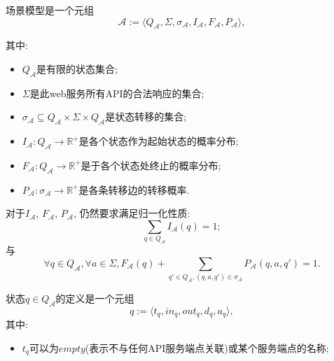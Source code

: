         \begin{definition}
            \label{def:our}
            场景模型是一个元组
            \begin{equation}
                \label{eq:scenario_model}
                 \mathcal{A} := \langle Q_{\mathcal{A}}, \Sigma, \sigma_{\mathcal{A}}, I_{\mathcal{A}}, F_{\mathcal{A}}, P_{\mathcal{A}} \rangle,
            \end{equation}
            
            其中:
            \begin{itemize}
                \item $Q_{\mathcal{A}}$是有限的状态集合;
                
                \item $\Sigma$是此web服务所有API的合法响应的集合;
                
                \item $\sigma_{\mathcal{A}} \subseteq Q_{\mathcal{A}} \times \Sigma \times Q_{\mathcal{A}}$是状态转移的集合;
                
                \item $I_{\mathcal{A}} : Q_{\mathcal{A}} \to \mathbb{R}^{+}$是各个状态作为起始状态的概率分布;
                
                \item $F_{\mathcal{A}} : Q_{\mathcal{A}} \to \mathbb{R}^{+}$是于各个状态处终止的概率分布;
                
                \item $P_{\mathcal{A}}: \sigma_{\mathcal{A}} \to \mathbb{R}^{+}$是各条转移边的转移概率.
            \end{itemize}
            
            对于$I_{\mathcal{A}}$, $F_{\mathcal{A}}$, $P_{\mathcal{A}}$, 仍然要求满足归一化性质:
            \begin{equation}
                \label{eq:model_normal1}
                \sum_{q \in Q_{\mathcal{A}}} I_{\mathcal{A}}(q) = 1;
            \end{equation}
            与
            \begin{equation}
                \label{eq:model_normal2}
                \forall q \in Q_{\mathcal{A}}, \forall a \in \Sigma, F_{\mathcal{A}}(q) + \sum_{q' \in Q_{\mathcal{A}}, (q,a,q') \in \sigma_{\mathcal{A}}} P_{\mathcal{A}}(q,a,q') = 1.
            \end{equation}
            
            状态$q \in Q_{\mathcal{A}}$的定义是一个元组
            \begin{equation}
                \label{eq:scenario_model_state}
                q := \langle t_q, in_q, out_q, d_q, a_q \rangle,
            \end{equation}
            其中:
            \begin{itemize}
                \item $t_q$可以为$empty$(表示不与任何API服务端点关联)或某个服务端点的名称;
                

\end{itemize}
\end{definition}
